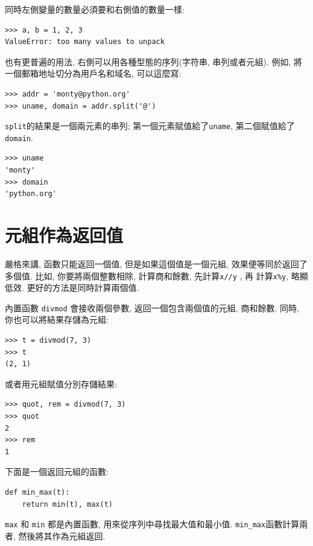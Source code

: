 \documentclass[10pt]{book}
\begin{document}
同時左側變量的數量必須要和右側值的數量一樣:

\begin{verbatim}
>>> a, b = 1, 2, 3
ValueError: too many values to unpack
\end{verbatim}
%
也有更普遍的用法, 右側可以用各種型態的序列(字符串, 串列或者元組). 
例如, 將一個郵箱地址切分為用戶名和域名, 可以這麼寫:

\begin{verbatim}
>>> addr = 'monty@python.org'
>>> uname, domain = addr.split('@')
\end{verbatim}
%
{\tt split}的結果是一個兩元素的串列;
第一個元素賦值給了{\tt uname}, 第二個賦值給了{\tt domain}. 

\begin{verbatim}
>>> uname
'monty'
>>> domain
'python.org'
\end{verbatim}
%

\section{元組作為返回值}
嚴格來講, 函數只能返回一個值, 但是如果這個值是一個元組, 
效果便等同於返回了多個值. 
比如, 你要將兩個整數相除, 計算商和餘數, 先計算{\tt x//y} , 再
計算{\tt x\%y}, 略顯低效. 更好的方法是同時計算兩個值. 

內置函數 {\tt divmod} 會接收兩個參數, 返回一個包含兩個值的元組, 
商和餘數. 同時, 你也可以將結果存儲為元組:

\begin{verbatim}
>>> t = divmod(7, 3)
>>> t
(2, 1)
\end{verbatim}
%
或者用元組賦值分別存儲結果:

\begin{verbatim}
>>> quot, rem = divmod(7, 3)
>>> quot
2
>>> rem
1
\end{verbatim}
%
下面是一個返回元組的函數:

\begin{verbatim}
def min_max(t):
    return min(t), max(t)
\end{verbatim}
%
{\tt max} 和 {\tt min} 都是內置函數,  用來從序列中尋找最大值和最小值. 
\verb"min_max"函數計算兩者, 然後將其作為元組返回. 
\end{document}
